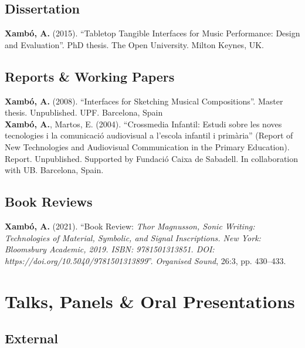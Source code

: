 \documentclass[10pt, a4paper]{article}
\newcommand{\years}[1]{\marginnote{\scriptsize #1}}
\begin{document}
\subsection*{Dissertation}
\noindent

\years{2015}\textbf{Xambó, A.} (2015). ``Tabletop Tangible Interfaces for Music Performance: Design and Evaluation''. PhD thesis. The Open University. Milton Keynes, UK.

\subsection*{Reports \& Working Papers}
\noindent

\years{2008}\textbf{Xambó, A.} (2008). ``Interfaces for Sketching Musical Compositions''. Master thesis. Unpublished. UPF. Barcelona, Spain\\ 
\years{2004}\textbf{Xambó, A.}, Martos, E. (2004). ``Crossmedia Infantil: Estudi sobre les noves tecnologies i la comunicació audiovisual a l'escola infantil i primària'' (Report of New Technologies and Audiovisual Communication in the Primary Education). Report. Unpublished. Supported by Fundació Caixa de Sabadell. In collaboration with UB. Barcelona, Spain.

\subsection*{Book Reviews}
\noindent

\years{2021}\textbf{Xambó, A.} (2021). ``Book Review: \emph{Thor Magnusson, Sonic Writing: Technologies of Material, Symbolic, and Signal Inscriptions. New York: Bloomsbury Academic, 2019. ISBN: 9781501313851. DOI: https://doi.org/10.5040/9781501313899}''. \emph{Organised Sound}, 26:3, pp. 430–433.


\section*{Talks, Panels \& Oral Presentations}

\subsection*{External}
\noindent
\end{document}
